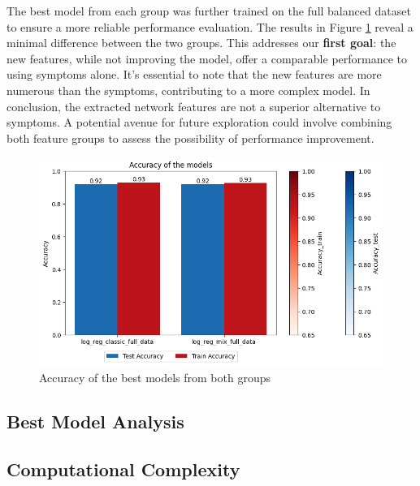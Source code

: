 \noindent
The best model from each group was further trained on the full balanced dataset to ensure a more reliable 
performance evaluation. The results in Figure \ref{fig:acc_best_models} reveal a minimal difference between 
the two groups. This addresses our \textbf{first goal}: the new features, while not improving the model, 
offer a comparable performance to using symptoms alone. It's essential to note that the new features are 
more numerous than the symptoms, contributing to a more complex model. In conclusion, the extracted network 
features are not a superior alternative to symptoms. A potential avenue for future exploration could involve 
combining both feature groups to assess the possibility of performance improvement.



\begin{figure}[H]
	\centering
	\includegraphics[width=\columnwidth]{images/acc_best_models.png}
	\caption{Accuracy of the best models from both groups}
	\label{fig:acc_best_models}
\end{figure}




\subsection{Best Model Analysis}



\subsection{Computational Complexity}



